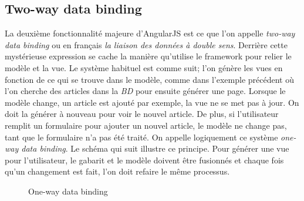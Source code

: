 \documentclass[a4paper,10pt,twoside]{sphinxmanual}
\begin{document}
\subsection{Two-way data binding}
\label{angularjs:two-way-data-binding}
La deuxième fonctionnalité majeure d'AngularJS est ce que l'on appelle \emph{two-way data binding} ou en français \emph{la liaison des données à double sens}. Derrière cette mystérieuse expression se cache la manière qu'utilise le framework pour relier le modèle et la vue. Le système habituel est comme suit; l'on génère les vues en fonction de ce qui se trouve dans le modèle, comme dans l'exemple précédent où l'on cherche des articles dans la \emph{BD} pour ensuite générer une page. Lorsque le modèle change, un article est ajouté par exemple, la vue ne se met pas à jour. On doit la générer à nouveau pour voir le nouvel article. De plus, si l'utilisateur remplit un formulaire pour ajouter un nouvel article, le modèle ne change pas, tant que le formulaire n'a pas été traité. On appelle logiquement ce système \emph{one-way data binding}. Le schéma qui suit illustre ce principe. Pour générer une vue pour l'utilisateur, le gabarit et le modèle doivent être fusionnés et chaque fois qu'un changement est fait, l'on doit refaire le même processus.
\begin{figure}[htbp]
\centering
\capstart

\caption{One-way data binding}\end{figure}
\end{document}
